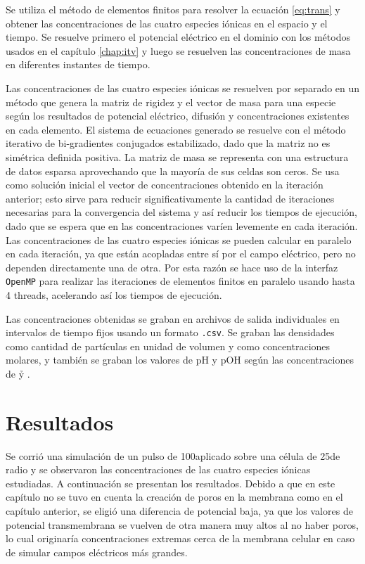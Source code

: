Se utiliza el método de elementos finitos para resolver la ecuación \ref{eq:trans} y obtener las concentraciones de las cuatro especies iónicas en el espacio y el tiempo. Se resuelve primero el potencial eléctrico en el dominio con los métodos usados en el capítulo \ref{chap:itv} y luego se resuelven las concentraciones de masa en diferentes instantes de tiempo.

Las concentraciones de las cuatro especies iónicas se resuelven por separado en un método que genera la matriz de rigidez y el vector de masa para una especie según los resultados de potencial eléctrico, difusión y concentraciones existentes en cada elemento. El sistema de ecuaciones generado se resuelve con el método iterativo de bi-gradientes conjugados estabilizado, dado que la matriz no es simétrica definida positiva. La matriz de masa se representa con una estructura de datos esparsa aprovechando que la mayoría de sus celdas son ceros. Se usa como solución inicial el vector de concentraciones obtenido en la iteración anterior; esto sirve para reducir significativamente la cantidad de iteraciones necesarias para la convergencia del sistema y así reducir los tiempos de ejecución, dado que se espera que en las concentraciones varíen levemente en cada iteración. Las concentraciones de las cuatro especies iónicas se pueden calcular en paralelo en cada iteración, ya que están acopladas entre sí por el campo eléctrico, pero no dependen directamente una de otra. Por esta razón se hace uso de la interfaz \texttt{OpenMP} para realizar las iteraciones de elementos finitos en paralelo usando hasta 4 threads, acelerando así los tiempos de ejecución.

Las concentraciones obtenidas se graban en archivos de salida individuales en intervalos de tiempo fijos usando un formato \texttt{.csv}. Se graban las densidades como cantidad de partículas en unidad de volumen y como concentraciones molares, y también se graban los valores de pH y pOH según las concentraciones de \h y \oh. 


\section{Resultados}

Se corrió una simulación de un pulso de 100\vcm aplicado sobre una célula de 25\um de radio y se observaron las concentraciones de las cuatro especies iónicas estudiadas. A continuación se presentan los resultados. Debido a que en este capítulo no se tuvo en cuenta la creación de poros en la membrana como en el capítulo anterior, se eligió una diferencia de potencial baja, ya que los valores de potencial transmembrana se vuelven de otra manera muy altos al no haber poros, lo cual originaría concentraciones extremas cerca de la membrana celular en caso de simular campos eléctricos más grandes.

